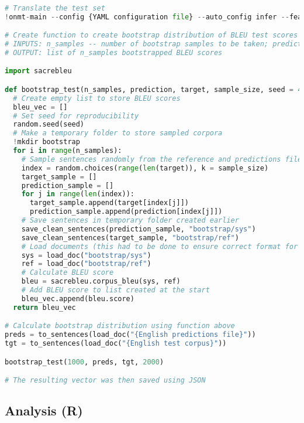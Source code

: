 \documentclass[11pt]{article}
\begin{document}
\begin{lstlisting}[language=Python]

# Translate the test set
!onmt-main --config {YAML configuration file} --auto_config infer --features_file {French test corpus} --predictions_file {English predictions output file}

# Create function to create bootstrap distribution of BLEU test scores
# INPUTS: n_samples -- number of bootstrap samples to be taken; prediction -- the predictions made from the translation model in list form; target -- the reference test set in English in list form; sample_size -- the size of each individual bootstrap sample; seed -- random seed for reproducibility
# OUTPUT: list of n_samples bootstrapped BLEU scores

import sacrebleu

def bootstrap_test(n_samples, prediction, target, sample_size, seed = 42):
  # Create empty list to store BLEU scores
  bleu_vec = []
  # Set seed for reproducibility
  random.seed(seed)
  # Make a temporary folder to store sampled corpora
  !mkdir bootstrap
  for i in range(n_samples):
    # Sample sentences randomly from the reference and predictions files
    index = random.choices(range(len(target)), k = sample_size)
    target_sample = []
    prediction_sample = []
    for j in range(len(index)):
      target_sample.append(target[index[j]])
      prediction_sample.append(prediction[index[j]])
    # Save sentences in temporary folder created earlier  
    save_clean_sentences(prediction_sample, "bootstrap/sys")
    save_clean_sentences(target_sample, "bootstrap/ref")
    # Load documents (this had to be done to ensure correct format for SacreBLEU)
    sys = load_doc("bootstrap/sys")
    ref = load_doc("bootstrap/ref")
    # Calculate BLEU score
    bleu = sacrebleu.corpus_bleu(sys, ref)
    # Add BLEU score to list created at the start
    bleu_vec.append(bleu.score)
  return bleu_vec

# Calculate bootstrap distribution using function above
preds = to_sentences(load_doc("{English predictions file}"))
tgt = to_sentences(load_doc("{English test corpus}"))

bootstrap_test(1000, preds, tgt, 2000)

# The resulting vector was then saved using JSON
\end{lstlisting}

\subsection{Analysis (R)}
\end{document}
